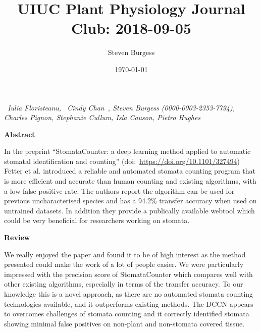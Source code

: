 \documentclass[10pt]{article}
\begin{document}
\title{UIUC Plant Physiology Journal Club: 2018-09-05}



\author[1]{Steven Burgess}%
%


\vspace{-1em}



  \date{\today}


\begingroup
\let\center\flushleft
\let\endcenter\endflushleft
\maketitle
\endgroup









\emph{~Iulia Floristeanu, ~\emph{Cindy Chan}~, Steven Burgess
(0000-0003-2353-7794), Charles Pignon, Stephanie Cullum, Isla Causon,
Pietro Hughes}

\textbf{Abstract}

In the preprint ``StomataCounter: a deep learning method applied to
automatic stomatal identification and counting''
(doi:~\url{https://doi.org/10.1101/327494}) Fetter et al. introduced a
reliable and automated stomata counting program that is more efficient
and accurate than human counting and existing algorithms, with a low
false positive rate. The authors report the algorithm can be used for
previous uncharacterised species and has a 94.2\% transfer accuracy when
used on untrained datasets. In addition they provide a publically
available webtool which could be very beneficial for researchers working
on stomata.

\par\null

\textbf{Review}

We really enjoyed the paper and found it to be of high interest as the
method presented could make the work of a lot of people easier. We were
particularly impressed with the precision score of StomataCounter which
compares well with other existing algorithms, especially in terms of the
transfer accuracy. To our knowledge this is a novel approach, as there
are no automated stomata counting technologies available, and it
outperforms existing methods. The DCCN appears to overcomes challenges
of stomata counting and it correctly identified stomata showing minimal
false positives on non-plant and non-stomata covered tissue.
\end{document}
